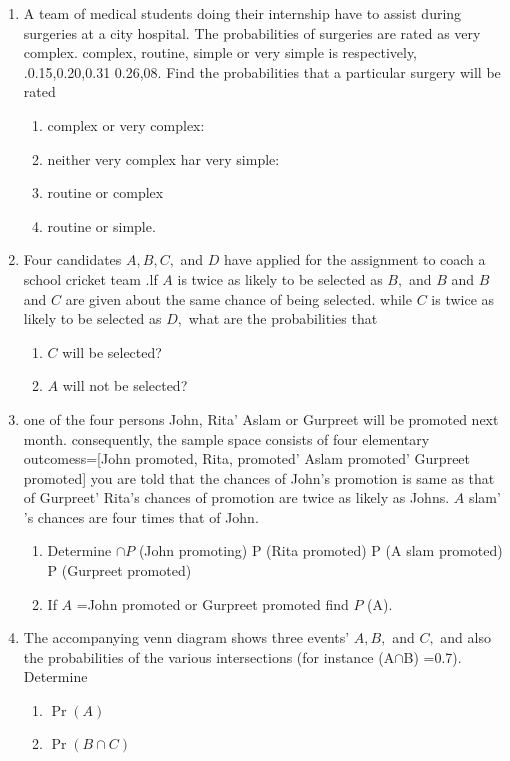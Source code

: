 \documentclass[12pt]{article}
\providecommand{\pr}[1]{\ensuremath{\Pr\left(#1\right)}}
\begin{document}
\begin{enumerate}
\begin{enumerate}
	\end{enumerate}
\item A team of medical students doing their internship have to assist during surgeries at a city hospital. The probabilities of surgeries are rated as very complex. complex, routine, simple or very simple is respectively, .0.15,0.20,0.31 0.26,08. Find the probabilities that a particular surgery will be rated
	\begin{enumerate}
\item complex or very complex:
\item neither very complex har very simple:
\item routine or complex 
\item routine or simple.
	\end{enumerate}
\item Four candidates $A, B, C,$ and $D$ have applied for the assignment to coach a school cricket team .lf $A$ is twice as likely to be selected as $B,$ and $B$ and $B$ and $C$ are given about the same chance of being selected. while $C$ is twice as likely to be selected as $D,$ what are the probabilities that
\begin{enumerate}
\item $C$ will be selected?
\item $A$ will not be selected?
\end{enumerate}
\item one of the four persons John, Rita' Aslam or Gurpreet will be promoted next month. consequently, the sample space consists of four elementary outcomess=[John promoted, Rita, promoted' Aslam promoted' Gurpreet promoted] you are told that the chances of John's promotion is same as that of Gurpreet' Rita's chances of promotion are twice as likely as Johns. $A$ slam' 's chances are four times that of John.
	\begin{enumerate}
\item Determine $\cap{P}$ (John promoting)
 P (Rita promoted)
 P (A slam promoted)
 P (Gurpreet promoted)
\item  If $A$ ={John promoted or Gurpreet promoted} find $P$ (A).
	\end{enumerate}
\item The accompanying venn diagram shows three events' $A, B,$ and $C,$ and also the probabilities of the various intersections (for instance (A$\cap$B) =0.7). Determine
\begin{enumerate}
\item $\pr{A}$
\item $\pr{B\cap C}$

\end{enumerate}
\end{enumerate}
\end{document}
